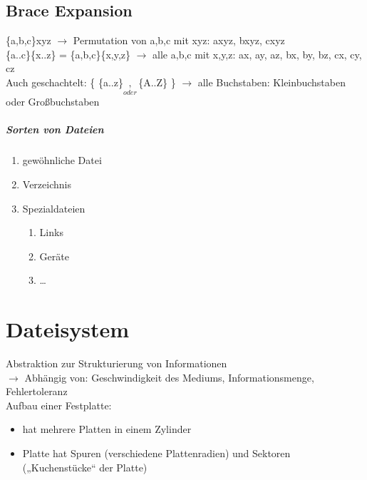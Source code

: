 \documentclass{scrreprt}
\begin{document}
\section{Brace Expansion}
\{a,b,c\}xyz $\to$ Permutation von a,b,c mit xyz: axyz, bxyz, cxyz\\
\{a..c\}\{x..z\} = \{a,b,c\}\{x,y,z\} $\to$ alle a,b,c mit x,y,z: ax, ay, az, bx, by, bz, cx, cy, cz\\
Auch geschachtelt: \{ \{a..z\}$\underset{oder}{,}$\{A..Z\} \} $\to$ alle Buchstaben: Kleinbuchstaben oder Großbuchstaben


\paragraph{Sorten von Dateien}
\begin{enumerate}
\item gewöhnliche Datei
\item Verzeichnis
\item Spezialdateien
\begin{enumerate} [label=$\to$]
\item Links
\item Geräte
\item …
\end{enumerate}
\end{enumerate}

\chapter{Dateisystem}
Abstraktion zur Strukturierung von Informationen\\
$\rightarrow$ Abhängig von: Geschwindigkeit des Mediums, Informationsmenge, Fehlertoleranz\\
Aufbau einer Festplatte:
\begin{itemize}
\item hat mehrere Platten in einem Zylinder
\item Platte hat Spuren (verschiedene Plattenradien) und Sektoren („Kuchenstücke“ der Platte)
\end{itemize}
\end{document}
